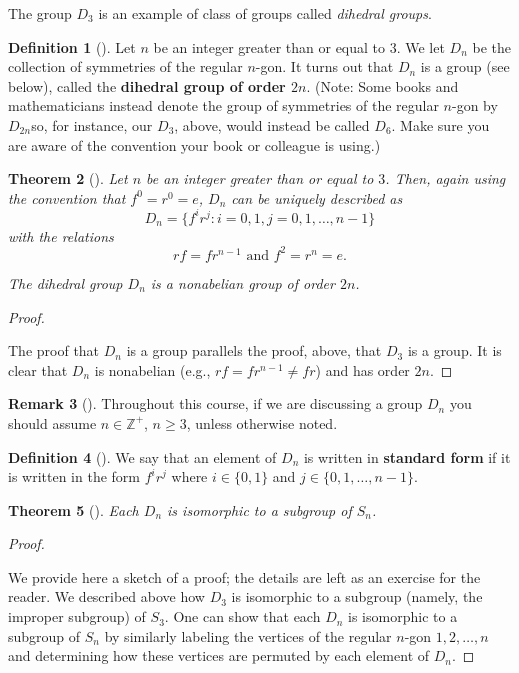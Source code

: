 \documentclass[10pt,openany,oneside]{book}
\newcommand{\terminology}[1]{\textbf{#1}}
\theoremstyle{plain}
\newtheorem{theorem}{Theorem}[section]
\theoremstyle{definition}
\newtheorem{definition}[theorem]{Definition}
\theoremstyle{definition}
\newtheorem{remark}[theorem]{Remark}
\theoremstyle{definition}
\theoremstyle{definition}
\numberwithin{equation}{section}
\def\Z{\mathbb{Z}}
\begin{document}
\par
The group \(D_3\) is an example of class of groups called \emph{dihedral groups}.%
\begin{definition}[{}]\label{definition-52}
\label{notation-62}
Let \(n\) be an integer greater than or equal to \(3\). We let \(D_n\) be the collection of symmetries of the regular \(n\)-gon. It turns out that \(D_n\) is a group (see below), called the \terminology{dihedral group of order \(2n\)}. (Note: Some books and mathematicians instead denote the group of symmetries of the regular \(n\)-gon by \(D_{2n}\)\textemdash{}so, for instance, our \(D_3\), above, would instead be called \(D_6\). Make sure you are aware of the convention your book or colleague is using.)%
\end{definition}
\begin{theorem}[{}]\label{rf}
Let \(n\) be an integer greater than or equal to \(3\). Then, again using the convention that \(f^0=r^0=e\), \(D_n\) can be uniquely described as%
\begin{equation*}
D_n=\{f^ir^j: i=0,1, j=0,1,\ldots, n-1\}
\end{equation*}
with the relations%
\begin{equation*}
rf=fr^{n-1} \text{ and }  f^2=r^n=e.
\end{equation*}
%
\par
The dihedral group \(D_n\) is a nonabelian group of order \(2n\).%
\end{theorem}
\begin{proof}\hypertarget{proof-30}{}
The proof that \(D_n\) is a group parallels the proof, above, that \(D_3\) is a group. It is clear that \(D_n\) is nonabelian (e.g., \(rf=fr^{n-1}\neq fr\)) and has order \(2n\).%
\end{proof}
\begin{remark}[]\label{remark-33}
Throughout this course, if we are discussing a group \(D_n\) you should assume \(n\in \Z^+\), \(n\geq 3\), unless otherwise noted.%
\end{remark}
\begin{definition}[{}]\label{definition-53}
We say that an element of \(D_n\) is written in \terminology{standard form} if it is written in the form \(f^ir^j\) where \(i\in \{0,1\}\) and \(j\in \{0,1,\ldots,n-1\}\).%
\end{definition}
\begin{theorem}[{}]\label{theorem-42}
Each \(D_n\) is isomorphic to a subgroup of \(S_n\).%
\end{theorem}
\begin{proof}\hypertarget{proof-31}{}
We provide here a sketch of a proof; the details are left as an exercise for the reader. We described above how \(D_3\) is isomorphic to a subgroup (namely, the improper subgroup) of \(S_3\). One can show that each \(D_n\) is isomorphic to a subgroup of \(S_n\) by similarly labeling the vertices of the regular \(n\)-gon \(1,2,\ldots, n\) and determining how these vertices are permuted by each element of \(D_n\).%
\end{proof}
\end{document}
